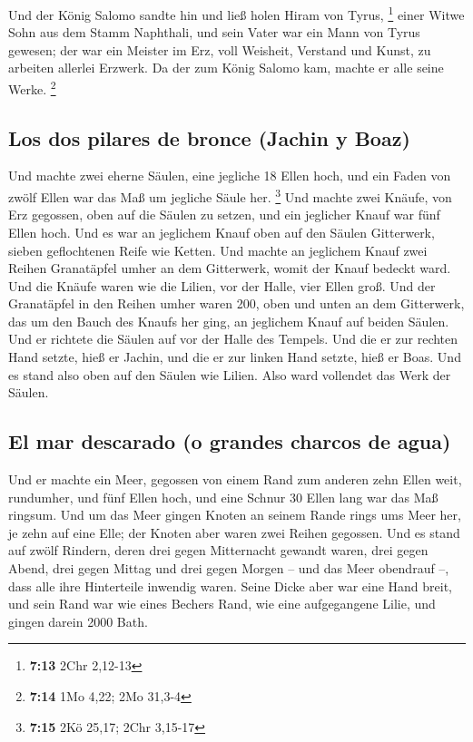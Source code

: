  Und der König Salomo sandte hin und ließ holen Hiram von
Tyrus, \footnote{\textbf{7:13} 2Chr 2,12-13}  einer Witwe
Sohn aus dem Stamm Naphthali, und sein Vater war ein Mann von Tyrus
gewesen; der war ein Meister im Erz, voll Weisheit, Verstand und Kunst,
zu arbeiten allerlei Erzwerk. Da der zum König Salomo kam, machte er
alle seine Werke. \footnote{\textbf{7:14} 1Mo 4,22; 2Mo 31,3-4}

\hypertarget{los-dos-pilares-de-bronce-jachin-y-boaz}{%
\subsection{Los dos pilares de bronce (Jachin y
Boaz)}\label{los-dos-pilares-de-bronce-jachin-y-boaz}}

 Und machte zwei eherne Säulen, eine jegliche 18 Ellen
hoch, und ein Faden von zwölf Ellen war das Maß um jegliche Säule her.
\footnote{\textbf{7:15} 2Kö 25,17; 2Chr 3,15-17}  Und
machte zwei Knäufe, von Erz gegossen, oben auf die Säulen zu setzen, und
ein jeglicher Knauf war fünf Ellen hoch.  Und es war an
jeglichem Knauf oben auf den Säulen Gitterwerk, sieben geflochtenen
Reife wie Ketten.  Und machte an jeglichem Knauf zwei
Reihen Granatäpfel umher an dem Gitterwerk, womit der Knauf bedeckt
ward.  Und die Knäufe waren wie die Lilien, vor der
Halle, vier Ellen groß.  Und der Granatäpfel in den
Reihen umher waren 200, oben und unten an dem Gitterwerk, das um den
Bauch des Knaufs her ging, an jeglichem Knauf auf beiden Säulen.
 Und er richtete die Säulen auf vor der Halle des
Tempels. Und die er zur rechten Hand setzte, hieß er Jachin, und die er
zur linken Hand setzte, hieß er Boas.  Und es stand also
oben auf den Säulen wie Lilien. Also ward vollendet das Werk der Säulen.

\hypertarget{el-mar-descarado-o-grandes-charcos-de-agua}{%
\subsection{El mar descarado (o grandes charcos de
agua)}\label{el-mar-descarado-o-grandes-charcos-de-agua}}

 Und er machte ein Meer, gegossen von einem Rand zum
anderen zehn Ellen weit, rundumher, und fünf Ellen hoch, und eine Schnur
30 Ellen lang war das Maß ringsum.  Und um das Meer
gingen Knoten an seinem Rande rings ums Meer her, je zehn auf eine Elle;
der Knoten aber waren zwei Reihen gegossen.  Und es stand
auf zwölf Rindern, deren drei gegen Mitternacht gewandt waren, drei
gegen Abend, drei gegen Mittag und drei gegen Morgen -- und das Meer
obendrauf --, dass alle ihre Hinterteile inwendig waren. 
Seine Dicke aber war eine Hand breit, und sein Rand war wie eines
Bechers Rand, wie eine aufgegangene Lilie, und gingen darein 2000 Bath.

